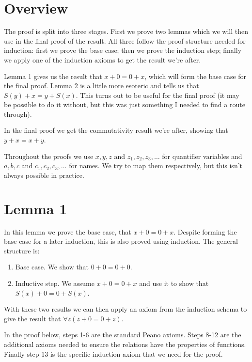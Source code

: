 \documentclass[10pt]{article}
\begin{document}
\section*{Overview}

The proof is split into three stages. First we prove two lemmas which we will then use in the final proof of the result. All three follow the proof structure needed for induction: first we prove the base case; then we prove the induction step; finally we apply one of the induction axioms to get the result we're after.

Lemma 1 gives us the result that $x + 0 = 0 + x$, which will form the base case for the final proof. Lemma 2 is a little more esoteric and tells us that $S(y) + x = y + S(x)$. This turns out to be useful for the final proof (it may be possible to do it without, but this was just something I needed to find a route through).

In the final proof we get the commutativity result we're after, showing that $y + x = x + y$.

Throughout the proofs we use $x, y, z$ and $z_1, z_2, z_3, \ldots$ for quantifier variables and $a, b, c$ and $c_1, c_2, c_3, \ldots$ for names. We try to map them respectively, but this isn't always possible in practice.

\section*{Lemma 1}

In this lemma we prove the base case, that $x + 0 = 0 + x$. Despite forming the base case for a later induction, this is also proved using induction. The general structure is:

\begin{enumerate}
\item Base case. We show that $0 + 0 = 0 + 0$.
\item Inductive step. We assume $x + 0 = 0 + x$ and use it to show that $S(x) + 0 = 0 + S(x)$.
\end{enumerate}

With these two results we can then apply an axiom from the induction schema to give the result that $\forall z (z + 0 = 0 + z)$.

In the proof below, steps 1-6 are the standard Peano axioms. Steps 8-12 are the additional axioms needed to ensure the relations have the properties of functions. Finally step 13 is the specific induction axiom that we need for the proof.
\end{document}
